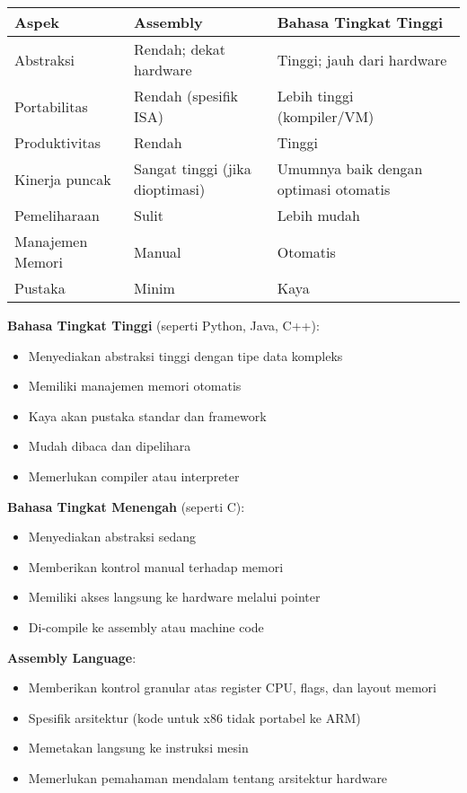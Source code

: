 \begin{center}
\begin{tabular}{p{} p{} p{}}
\hline
\textbf{Aspek} & \textbf{Assembly} & \textbf{Bahasa Tingkat Tinggi} \\
\hline
Abstraksi & Rendah; dekat hardware & Tinggi; jauh dari hardware \\
Portabilitas & Rendah (spesifik ISA) & Lebih tinggi (kompiler/VM) \\
Produktivitas & Rendah & Tinggi \\
Kinerja puncak & Sangat tinggi (jika dioptimasi) & Umumnya baik dengan optimasi otomatis \\
Pemeliharaan & Sulit & Lebih mudah \\
Manajemen Memori & Manual & Otomatis \\
Pustaka & Minim & Kaya \\
\hline
\end{tabular}
\end{center}

\textbf{Bahasa Tingkat Tinggi} (seperti Python, Java, C++):
\begin{itemize}
    \item Menyediakan abstraksi tinggi dengan tipe data kompleks
    \item Memiliki manajemen memori otomatis
    \item Kaya akan pustaka standar dan framework
    \item Mudah dibaca dan dipelihara
    \item Memerlukan compiler atau interpreter
\end{itemize}

\textbf{Bahasa Tingkat Menengah} (seperti C):
\begin{itemize}
    \item Menyediakan abstraksi sedang
    \item Memberikan kontrol manual terhadap memori
    \item Memiliki akses langsung ke hardware melalui pointer
    \item Di-compile ke assembly atau machine code
\end{itemize}

\textbf{Assembly Language}:
\begin{itemize}
    \item Memberikan kontrol granular atas register CPU, flags, dan layout memori
    \item Spesifik arsitektur (kode untuk x86 tidak portabel ke ARM)
    \item Memetakan langsung ke instruksi mesin
    \item Memerlukan pemahaman mendalam tentang arsitektur hardware
\end{itemize}

